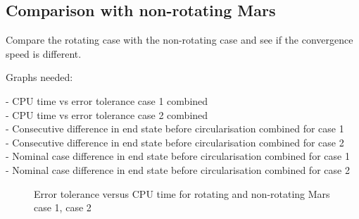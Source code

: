 \subsection{Comparison with non-rotating Mars}
\label{subsec:errorToleranceCompNotRot}
Compare the rotating case with the non-rotating case and see if the convergence speed is different. 

Graphs needed: 

- CPU time vs error tolerance case 1 combined \\
- CPU time vs error tolerance case 2 combined \\
- Consecutive difference in end state before circularisation combined for case 1 \\
- Consecutive difference in end state before circularisation combined for case 2 \\
- Nominal case difference in end state before circularisation combined for case 1 \\
- Nominal case difference in end state before circularisation combined for case 2 \\

\begin{figure}
\centering
{} 
\caption{Error tolerance versus CPU time for rotating and non-rotating Mars \protect{} case 1,  \protect{} case 2 } 
\label{fig:orderVsCPUcase1combined} 
\end{figure} 

